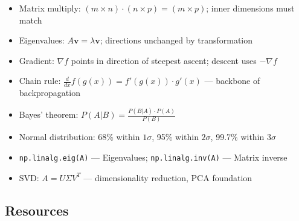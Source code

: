 \documentclass[11pt, a4paper, oneside]{report}
\begin{document}
\begin{cheatsheetbox}
\begin{itemize}[leftmargin=*]
\item Matrix multiply: $(m \times n) \cdot (n \times p) = (m \times p)$; inner dimensions must match
\item Eigenvalues: $A\mathbf{v} = \lambda\mathbf{v}$; directions unchanged by transformation
\item Gradient: $\nabla f$ points in direction of steepest ascent; descent uses $-\nabla f$
\item Chain rule: $\frac{d}{dx}f(g(x)) = f'(g(x)) \cdot g'(x)$ --- backbone of backpropagation
\item Bayes' theorem: $P(A|B) = \frac{P(B|A) \cdot P(A)}{P(B)}$
\item Normal distribution: 68\% within $1\sigma$, 95\% within $2\sigma$, 99.7\% within $3\sigma$
\item \texttt{np.linalg.eig(A)} --- Eigenvalues; \texttt{np.linalg.inv(A)} --- Matrix inverse
\item SVD: $A = U\Sigma V^T$ --- dimensionality reduction, PCA foundation
\end{itemize}
\end{cheatsheetbox}

\subsection*{Resources}
\end{document}

